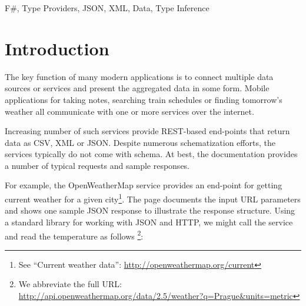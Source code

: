 \documentclass[preprint]{sigplanconf}
\begin{document}
\keywords F\#, Type Providers, JSON, XML, Data, Type Inference



%
%

\section{Introduction}
\label{sec:introduction}

The key function of many modern applications is to connect multiple data sources or services and
present the aggregated data in some form. Mobile applications for taking notes, searching train
schedules or finding tomorrow's weather all communicate with one or more services over the internet.

Increasing number of such services provide REST-based end-points that return data as CSV, XML
or JSON. Despite numerous schematization efforts, the services typically do not come with schema.
At best, the documentation provides a number of typical requests and sample responses.

For example, the OpenWeatherMap service provides an end-point for getting current weather for a 
given city\footnote{See ``Current weather data'': \url{http://openweathermap.org/current}}. The page documents the input 
URL parameters and shows one sample JSON response to illustrate the response structure.
Using a standard library for working with JSON and HTTP, we might call the service and 
read the temperature as follows \footnote{We abbreviate the full URL: 
\url{http://api.openweathermap.org/data/2.5/weather?q=Prague\&units=metric}}:
\end{document}
